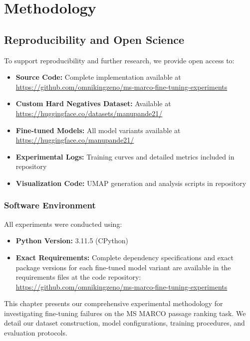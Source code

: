 
\chapter{Methodology} %

\label{Chapter4} %


\section{Reproducibility and Open Science}

To support reproducibility and further research, we provide open access to:

\begin{itemize}
\item \textbf{Source Code:} Complete implementation available at \url{https://github.com/omnikingzeno/ms-marco-fine-tuning-experiments}
\item \textbf{Custom Hard Negatives Dataset:} Available at \url{https://huggingface.co/datasets/manupande21/}
\item \textbf{Fine-tuned Models:} All model variants available at \url{https://huggingface.co/manupande21/}
\item \textbf{Experimental Logs:} Training curves and detailed metrics included in repository
\item \textbf{Visualization Code:} UMAP generation and analysis scripts in repository
\end{itemize}

\subsection{Software Environment}

All experiments were conducted using:
\begin{itemize}
\item \textbf{Python Version:} 3.11.5 (CPython)
\item \textbf{Exact Requirements:} Complete dependency specifications and exact package versions for each fine-tuned model variant are available in the requirements files at the code repository: \url{https://github.com/omnikingzeno/ms-marco-fine-tuning-experiments}
\end{itemize}

This chapter presents our comprehensive experimental methodology for investigating fine-tuning failures on the MS MARCO passage ranking task. We detail our dataset construction, model configurations, training procedures, and evaluation protocols.

